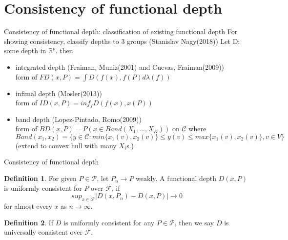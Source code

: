 \documentclass[aspectratio=169,ignorenonframetext,9pt]{beamer}
\theoremstyle{plain}
\theoremstyle{definition}
\newtheorem{defn}{Definition}[section]
\begin{document}
\section{Consistency of functional depth}
\begin{frame}{Consistency of functional depth: classification of existing functional depth}
    For showing consistency, classify depths to 3 groups (Stanislav Nagy(2018))
    Let D: some depth in $\mathbb{R}^p$. then
    \begin{itemize}
        \item integrated depth (Fraiman, Muniz(2001) and  Cuevas, Fraiman(2009)) \\
        form of \(FD(x,P)=\int D(f(x),f(P)d\lambda(f))\)
        \item infimal depth (Mosler(2013))\\
        form of \(ID(x,P)=inf_f D(f(x),x(P))\)
        \item band depth (Lopez-Pintado, Romo(2009))\\
        form of \(BD(x,P)=P(x\in Band(X_1,...,X_K))\) on $\mathcal{C}$
        where $Band(x_1,x_2)=\{y\in\mathcal{C}: min\{x_1(v),x_2(v)\} \leq y(v) \leq max\{x_1(v),x_2(v)\}, v\in V\}$ \\
        (extend to convex hull with many $X_i$s.)
    \end{itemize}
\end{frame}

\begin{frame}{Consistency of functional depth}
    \begin{defn}
        For given $P\in\mathcal{P}$, let $P_n\rightarrow P$ weakly.
        A functional depth $D(x,P)$ is uniformly consistent for $P$ over $\mathcal{F}$,
        if
        \[sup_{x\in\mathcal{F}}|D(x,P_n)-D(x,P)|\rightarrow 0\]
        for almost every $x$ as $n\rightarrow\infty$.
    \end{defn}
    \begin{defn}
        If $D$ is uniformly consistent for any $P\in\mathcal{P}$,
        then we say $D$ is universally consistent over $\mathcal{F}$.
    \end{defn}

\end{frame}
\end{document}
